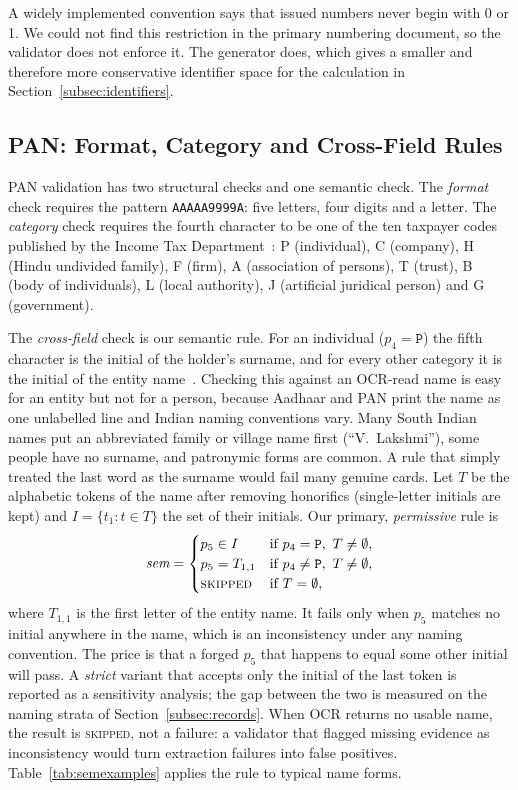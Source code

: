 \documentclass[conference]{IEEEtran}
\begin{document}
A widely implemented convention says that issued numbers never begin
with 0 or 1. We could not find this restriction in the primary
numbering document, so the validator does not enforce it. The generator
does, which gives a smaller and therefore more conservative identifier
space for the calculation in Section~\ref{subsec:identifiers}.

\subsection{PAN: Format, Category and Cross-Field Rules}
\label{sec:pan-validation}

PAN validation has two structural checks and one semantic check. The
\emph{format} check requires the pattern \texttt{AAAAA9999A}: five
letters, four digits and a letter. The \emph{category} check requires
the fourth character to be one of the ten taxpayer codes published by
the Income Tax Department~\cite{itd-pan}: P (individual), C (company),
H (Hindu undivided family), F (firm), A (association of persons),
T (trust), B (body of individuals), L (local authority), J (artificial
juridical person) and G (government).

The \emph{cross-field} check is our semantic rule. For an individual
($p_4=\texttt{P}$) the fifth character is the initial of the holder's
surname, and for every other category it is the initial of the entity
name~\cite{itd-pan}. Checking this against an OCR-read name is easy for
an entity but not for a person, because Aadhaar and PAN print the name
as one unlabelled line and Indian naming conventions vary. Many South
Indian names put an abbreviated family or village name first
(``V.~Lakshmi''), some people have no surname, and patronymic forms are
common. A rule that simply treated the last word as the surname would
fail many genuine cards. Let $T$ be the alphabetic tokens of the name
after removing honorifics (single-letter initials are kept) and
$I=\{t_1 : t\in T\}$ the set of their initials. Our primary,
\emph{permissive} rule is
\begin{equation}
\label{eq:sem}
\textit{sem} =
\begin{cases}
p_5 \in I        & \text{if } p_4=\texttt{P},\ T\neq\emptyset,\\
p_5 = T_{1,1}    & \text{if } p_4\neq\texttt{P},\ T\neq\emptyset,\\
\textsc{skipped} & \text{if } T=\emptyset,
\end{cases}
\end{equation}
where $T_{1,1}$ is the first letter of the entity name. It fails only
when $p_5$ matches no initial anywhere in the name, which is an
inconsistency under any naming convention. The price is that a forged
$p_5$ that happens to equal some other initial will pass. A
\emph{strict} variant that accepts only the initial of the last token is
reported as a sensitivity analysis; the gap between the two is measured
on the naming strata of Section~\ref{subsec:records}. When OCR returns
no usable name, the result is \textsc{skipped}, not a failure: a
validator that flagged missing evidence as inconsistency would turn
extraction failures into false positives.
Table~\ref{tab:semexamples} applies the rule to typical name forms.
\end{document}
